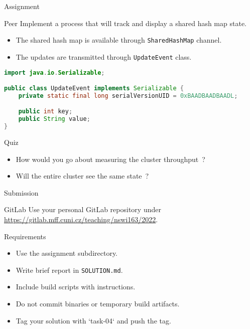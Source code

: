 \begin{frame}[fragile]{Assignment}
    \begin{block}{Peer}
        Implement a process that will track and display a shared hash map state.
        \begin{itemize}
            \item The shared hash map is available through \lstinline{SharedHashMap} channel.
            \item The updates are transmitted through \lstinline{UpdateEvent} class.
        \end{itemize}
    \end{block}

\begin{lstlisting}[language=java,style=mini]
import java.io.Serializable;

public class UpdateEvent implements Serializable {
    private static final long serialVersionUID = 0xBAADBAADBAADL;

    public int key;
    public String value;
}
\end{lstlisting}

    \begin{block}{Quiz}
        \begin{itemize}
            \item How would you go about measuring the cluster throughput~?
            \item Will the entire cluster see the same state~?
        \end{itemize}
    \end{block}
\end{frame}


\begin{frame}{Submission}
    \begin{block}{GitLab}
        Use your personal GitLab repository under \\
        \url{https://gitlab.mff.cuni.cz/teaching/nswi163/2022}.
    \end{block}
    \begin{block}{Requirements}
        \begin{itemize}
            \item Use the assignment subdirectory.
            \item Write brief report in \lstinline{SOLUTION.md}.
            \item Include build scripts with instructions.
            \item Do not commit binaries or temporary build artifacts.
            \item Tag your solution with `task-04` and push the tag.
        \end{itemize}
    \end{block}
\end{frame}



